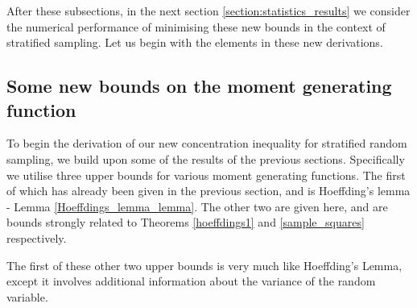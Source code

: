 After these subsections, in the next section \ref{section:statistics_results} we consider the numerical performance of minimising these new bounds in the context of stratified sampling.
Let us begin with the elements in these new derivations.



\subsection{Some new bounds on the moment generating function}\label{subsection:new_bounds}

To begin the derivation of our new concentration inequality for stratified random sampling, we build upon some of the results of the previous sections.
Specifically we utilise three upper bounds for various moment generating functions.
The first of which has already been given in the previous section, and is Hoeffding's lemma - Lemma \ref{Hoeffdings_lemma_lemma}.
The other two are given here, and are bounds strongly related to Theorems \ref{hoeffdings1} and \ref{sample_squares} respectively.

The first of these other two upper bounds is very much like Hoeffding's Lemma, except it involves additional information about the variance of the random variable.

